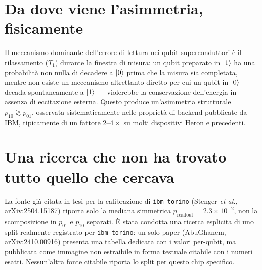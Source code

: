 \documentclass[11pt,a4paper]{article}
\begin{document}

\section{Da dove viene l'asimmetria, fisicamente}

Il meccanismo dominante dell'errore di lettura nei qubit superconduttori è il
rilassamento ($T_1$) durante la finestra di misura: un qubit preparato in
$\lvert 1\rangle$ ha una probabilità non nulla di decadere a $\lvert 0\rangle$ prima che la misura
sia completata, mentre non esiste un meccanismo altrettanto diretto per cui un
qubit in $\lvert 0\rangle$ decada spontaneamente a $\lvert 1\rangle$ --- violerebbe la
conservazione dell'energia in assenza di eccitazione esterna. Questo produce
un'asimmetria strutturale $p_{10}\gtrsim p_{01}$, osservata sistematicamente
nelle proprietà di backend pubblicate da IBM, tipicamente di un fattore
$2$--$4\times$ su molti dispositivi Heron e precedenti.

\section{Una ricerca che non ha trovato tutto quello che cercava}

La fonte già citata in tesi per la calibrazione di \texttt{ibm\_torino}
(Stenger \emph{et al.}, arXiv:2504.15187) riporta solo la mediana simmetrica
$p_\text{readout}=2.3\times10^{-2}$, non la scomposizione in $p_{01}$ e
$p_{10}$ separati. È stata condotta una ricerca esplicita di uno split
realmente registrato per \texttt{ibm\_torino}: un solo paper (AbuGhanem,
arXiv:2410.00916) presenta una tabella dedicata con i valori per-qubit, ma
pubblicata come immagine non estraibile in forma testuale citabile con i
numeri esatti. Nessun'altra fonte citabile riporta lo split per questo chip
specifico.
\end{document}
